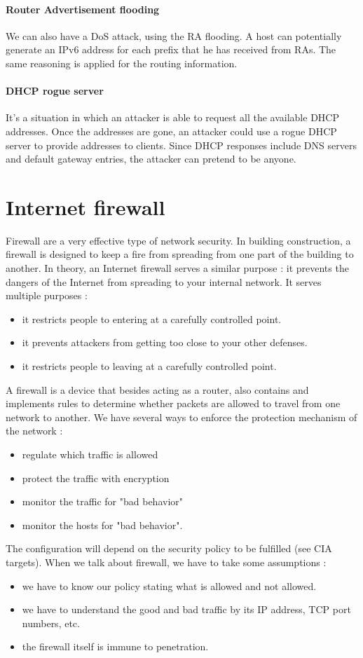 \documentclass[11pt]{article}
\begin{document}
\paragraph{Router Advertisement flooding} We can also have a DoS attack, using the RA flooding. A host can potentially generate an IPv6 address for each prefix that he has received from RAs. The same reasoning is applied for the routing information.
\paragraph{DHCP rogue server} It's a situation in which an attacker is able to request all the available DHCP addresses. Once the addresses are gone, an attacker could use a rogue DHCP server to provide addresses to clients. Since DHCP responses include DNS servers and default gateway entries, the attacker can pretend to be anyone.
\section{Internet firewall}
Firewall are a very effective type of network security. In building construction, a firewall is designed to keep a fire from spreading from one part of the building to another. In theory, an Internet firewall serves a similar purpose : it prevents the dangers of the Internet from spreading to your internal network. It serves multiple purposes : 
\begin{itemize}
\item it restricts people to entering at a carefully controlled point.
\item it prevents attackers from getting too close to your other defenses.
\item it restricts people to leaving at a carefully controlled point.
\end{itemize}
A firewall is a device that besides acting as a router, also contains and implements rules to determine whether packets are allowed to travel from one network to another. We have several ways to enforce the protection mechanism of the network :
\begin{itemize}
\item regulate which traffic is allowed
\item protect the traffic with encryption
\item monitor the traffic for "bad behavior"
\item monitor the hosts for "bad behavior".
\end{itemize}
The configuration will depend on the security policy to be fulfilled (see CIA targets). When we talk about firewall, we have to take some assumptions : 
\begin{itemize}
\item we have to know our policy stating what is allowed and not allowed.
\item we have to understand the good and bad traffic by its IP address, TCP port numbers, etc.
\item the firewall itself is immune to penetration.
\end{itemize}
\end{document}
